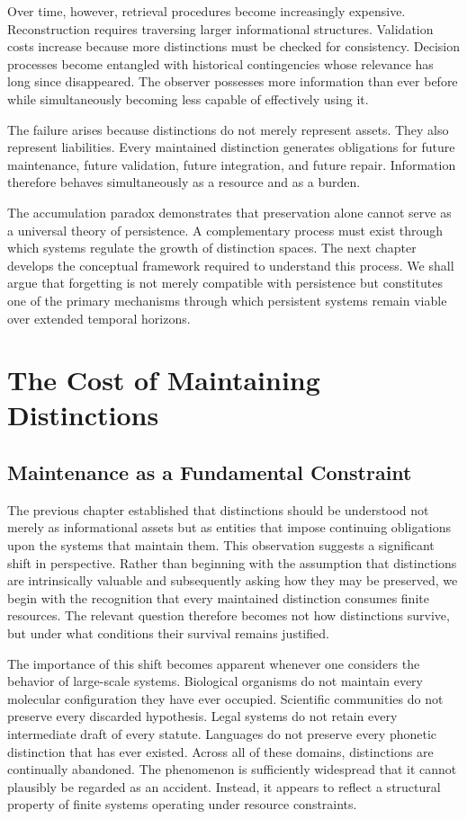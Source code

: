 \documentclass[12pt,oneside]{book}
\theoremstyle{plain} \newtheorem{theorem}{Theorem}[chapter] \newtheorem{lemma}[theorem]{Lemma} \newtheorem{proposition}[theorem]{Proposition} \newtheorem{corollary}[theorem]{Corollary}
\theoremstyle{definition} \newtheorem{definition}[theorem]{Definition} \newtheorem{axiom}[theorem]{Axiom} \newtheorem{construction}[theorem]{Construction}
\theoremstyle{remark} \newtheorem{remark}[theorem]{Remark} \newtheorem{example}[theorem]{Example}
\begin{document}
Over time, however, retrieval procedures become increasingly expensive. Reconstruction requires traversing larger informational structures. Validation costs increase because more distinctions must be checked for consistency. Decision processes become entangled with historical contingencies whose relevance has long since disappeared. The observer possesses more information than ever before while simultaneously becoming less capable of effectively using it.

The failure arises because distinctions do not merely represent assets. They also represent liabilities. Every maintained distinction generates obligations for future maintenance, future validation, future integration, and future repair. Information therefore behaves simultaneously as a resource and as a burden.

The accumulation paradox demonstrates that preservation alone cannot serve as a universal theory of persistence. A complementary process must exist through which systems regulate the growth of distinction spaces. The next chapter develops the conceptual framework required to understand this process. We shall argue that forgetting is not merely compatible with persistence but constitutes one of the primary mechanisms through which persistent systems remain viable over extended temporal horizons.

\chapter{The Cost of Maintaining Distinctions}

\section{Maintenance as a Fundamental Constraint}

The previous chapter established that distinctions should be understood not merely as informational assets but as entities that impose continuing obligations upon the systems that maintain them. This observation suggests a significant shift in perspective. Rather than beginning with the assumption that distinctions are intrinsically valuable and subsequently asking how they may be preserved, we begin with the recognition that every maintained distinction consumes finite resources. The relevant question therefore becomes not how distinctions survive, but under what conditions their survival remains justified.

The importance of this shift becomes apparent whenever one considers the behavior of large-scale systems. Biological organisms do not maintain every molecular configuration they have ever occupied. Scientific communities do not preserve every discarded hypothesis. Legal systems do not retain every intermediate draft of every statute. Languages do not preserve every phonetic distinction that has ever existed. Across all of these domains, distinctions are continually abandoned. The phenomenon is sufficiently widespread that it cannot plausibly be regarded as an accident. Instead, it appears to reflect a structural property of finite systems operating under resource constraints.
\end{document}
